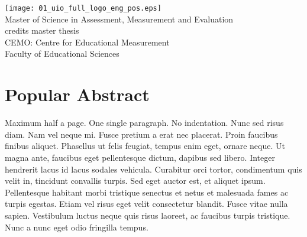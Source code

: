 \documentclass[a4paper,12pt,stu,donotrepeattitle,floatsintext,twoside]{apa7}
\begin{document}
\begin{titlepage}
    \thispagestyle{empty} %
    \centering %

    \vspace{5\baselineskip}

    \fontsize{24}{20pt}\selectfont
    \titlet\par
    \vspace{2.5\baselineskip}

    \fontsize{16}{12pt}\selectfont \authort\par
    \vspace{2.5\baselineskip}
    \hrulefill
    \vspace{2.5\baselineskip}
    \texttt{[image: 01\_uio\_full\_logo\_eng\_pos.eps]}\\[\baselineskip]

    \fontsize{16}{16pt}\selectfont Master of Science in Assessment, Measurement and Evaluation\\
    \fontsize{16}{16pt} credits master thesis\\[1.5\baselineskip]

    \fontsize{16}{12pt}\selectfont CEMO: Centre for Educational Measurement\\
    \fontsize{16}{12pt}\selectfont Faculty of Educational Sciences\\[1.5\baselineskip]
    \fontsize{12}{12pt}\selectfont \semester\par
\end{titlepage}
\cleardoublepage



\section*{Popular Abstract}

\noindent Maximum half a page. One single paragraph. No indentation. Nunc sed risus diam. Nam vel neque mi. Fusce pretium a erat nec placerat. Proin faucibus finibus aliquet. Phasellus ut felis feugiat, tempus enim eget, ornare neque. Ut magna ante, faucibus eget pellentesque dictum, dapibus sed libero. Integer hendrerit lacus id lacus sodales vehicula. Curabitur orci tortor, condimentum quis velit in, tincidunt convallis turpis. Sed eget auctor est, et aliquet ipsum. Pellentesque habitant morbi tristique senectus et netus et malesuada fames ac turpis egestas. Etiam vel risus eget velit consectetur blandit. Fusce vitae nulla sapien. Vestibulum luctus neque quis risus laoreet, ac faucibus turpis tristique. Nunc a nunc eget odio fringilla tempus.
\end{document}

